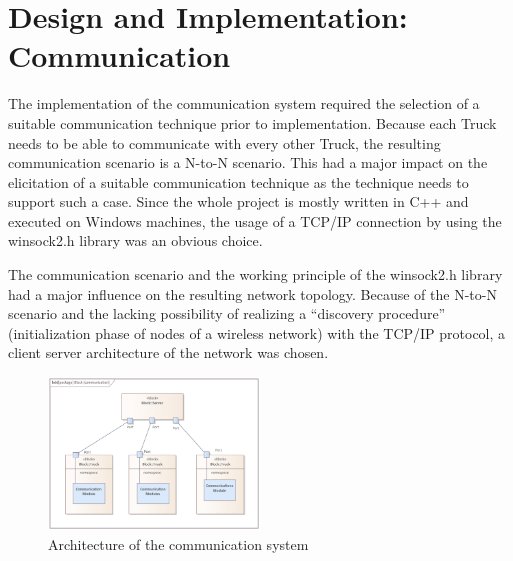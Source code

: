 \section{Design and Implementation: Communication}
\label{sec:communication}
The implementation of the communication system required the selection of a suitable communication technique prior to implementation.
Because each Truck needs to be able to communicate with every other Truck, the resulting communication scenario is a N-to-N scenario.
This had a major impact on the elicitation of a suitable communication technique as the technique needs to support such a case.
Since the whole project is mostly written in C++ and executed on Windows machines, the usage of a TCP/IP connection by using the winsock2.h library
was an obvious choice.

\par

The communication scenario and the working principle of the winsock2.h library had a major influence on the resulting network topology. Because of
the N-to-N scenario and the lacking possibility of realizing a “discovery procedure” (initialization phase of nodes of a wireless network) with the
TCP/IP protocol, a client server architecture of the network was chosen.
\begin{figure}[ht]
    \centering
    \includegraphics[width=0.5\textwidth]{images/comms_architecture.png}
    \caption{Architecture of the communication system}
    \label{img:comms_arch}
\end{figure}

